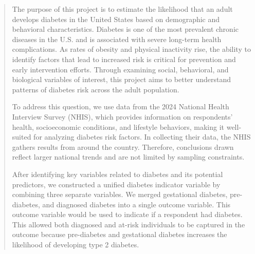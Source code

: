 \documentclass{article}
\theoremstyle{plain}
\theoremstyle{definition}
\theoremstyle{remark}
\begin{document}

\setlength{\parindent}{1.5em} 
\setlength{\parskip}{0pt} 

\begin{abstract}
The purpose of this project is to estimate the likelihood that an adult develops diabetes in the United States based on demographic and behavioral characteristics. Diabetes is one of the most prevalent chronic diseases in the U.S. and is associated with severe long-term health complications. As rates of obesity and physical inactivity rise, the ability to identify factors that lead to increased risk is critical for prevention and early intervention efforts. Through examining social, behavioral, and biological variables of interest, this project aims to better understand patterns of diabetes risk across the adult population. 

To address this question, we use data from the 2024 National Health Interview Survey (NHIS), which provides information on respondents' health, socioeconomic conditions, and lifestyle behaviors, making it well-suited for analyzing diabetes risk factors. In collecting their data, the NHIS gathers results from around the country. Therefore, conclusions drawn reflect larger national trends and are not limited by sampling constraints.

After identifying key variables related to diabetes and its potential predictors, we constructed a unified diabetes indicator variable by combining three separate variables. We merged gestational diabetes, pre-diabetes, and diagnosed diabetes into a single outcome variable. This outcome variable would be used to indicate if a respondent had diabetes. This allowed both diagnosed and at-risk individuals to be captured in the outcome because pre-diabetes and gestational diabetes increases the likelihood of developing type 2 diabetes. 


\end{abstract}
\end{document}
